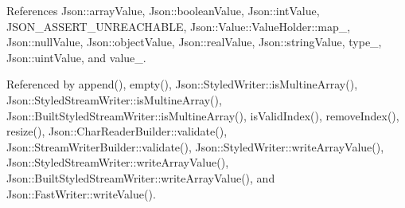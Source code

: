 References Json\+::array\+Value, Json\+::boolean\+Value, Json\+::int\+Value, J\+S\+O\+N\+\_\+\+A\+S\+S\+E\+R\+T\+\_\+\+U\+N\+R\+E\+A\+C\+H\+A\+B\+LE, Json\+::\+Value\+::\+Value\+Holder\+::map\+\_\+, Json\+::null\+Value, Json\+::object\+Value, Json\+::real\+Value, Json\+::string\+Value, type\+\_\+, Json\+::uint\+Value, and value\+\_\+.



Referenced by append(), empty(), Json\+::\+Styled\+Writer\+::is\+Multine\+Array(), Json\+::\+Styled\+Stream\+Writer\+::is\+Multine\+Array(), Json\+::\+Built\+Styled\+Stream\+Writer\+::is\+Multine\+Array(), is\+Valid\+Index(), remove\+Index(), resize(), Json\+::\+Char\+Reader\+Builder\+::validate(), Json\+::\+Stream\+Writer\+Builder\+::validate(), Json\+::\+Styled\+Writer\+::write\+Array\+Value(), Json\+::\+Styled\+Stream\+Writer\+::write\+Array\+Value(), Json\+::\+Built\+Styled\+Stream\+Writer\+::write\+Array\+Value(), and Json\+::\+Fast\+Writer\+::write\+Value().


